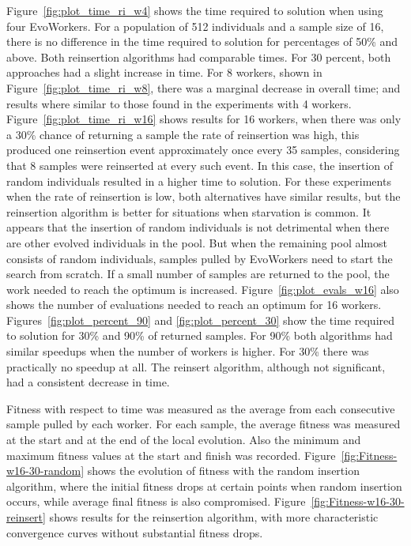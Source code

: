 Figure~\ref{fig:plot_time_ri_w4} shows the time required 
to solution when using four EvoWorkers. For a population of
512 individuals and a sample size of 16, there is no
difference in the time required to solution for 
percentages of 50\% and above. Both reinsertion algorithms
had comparable times. For 30 percent, both approaches 
had a slight increase in time. For 8 workers, shown in Figure~\ref{fig:plot_time_ri_w8},  there was a marginal
decrease in overall time; and results where similar to those found in the experiments with 4 workers.  
Figure~\ref{fig:plot_time_ri_w16} shows results for 16 workers,
when there was only a 30\% chance of returning a sample the rate of reinsertion was high, this produced one reinsertion event approximately once every 35 samples,
considering that 8 samples were reinserted at every such event.
In this case, the insertion of random individuals resulted in a higher time to solution.
For these experiments when the rate of reinsertion is low, both alternatives
have similar results, but the reinsertion algorithm is better
for situations when starvation is common.
It appears that the insertion of random individuals is not detrimental when there
are other evolved individuals in the pool. But when the remaining
pool almost consists of random individuals, samples pulled by
EvoWorkers need to start the search from scratch. 
If a small number of samples are returned to the pool, the work needed to reach the
optimum is increased. Figure~\ref{fig:plot_evals_w16} also shows the number 
of evaluations needed to reach an optimum for 16 workers.
Figures~\ref{fig:plot_percent_90} and \ref{fig:plot_percent_30} show
the time required to solution for 30\% and 90\% of returned samples.
For 90\% both algorithms had similar speedups when the number of
workers is higher.
For 30\% there was practically no speedup at all. The reinsert algorithm,
although not significant, had a consistent decrease in time.         

Fitness with respect to time was measured as the average from each consecutive
sample pulled by each worker. For each sample, the average fitness
was measured at the start and at the end of the local evolution.
Also the minimum and maximum fitness values at the start and finish was 
recorded.    
Figure~\ref{fig:Fitness-w16-30-random} shows the evolution of fitness
with the random insertion algorithm, where the initial fitness drops
at certain points when random insertion occurs, while average final fitness 
is also compromised. Figure~\ref{fig:Fitness-w16-30-reinsert}
shows results for the reinsertion algorithm, with more
characteristic convergence curves without substantial fitness drops. 





